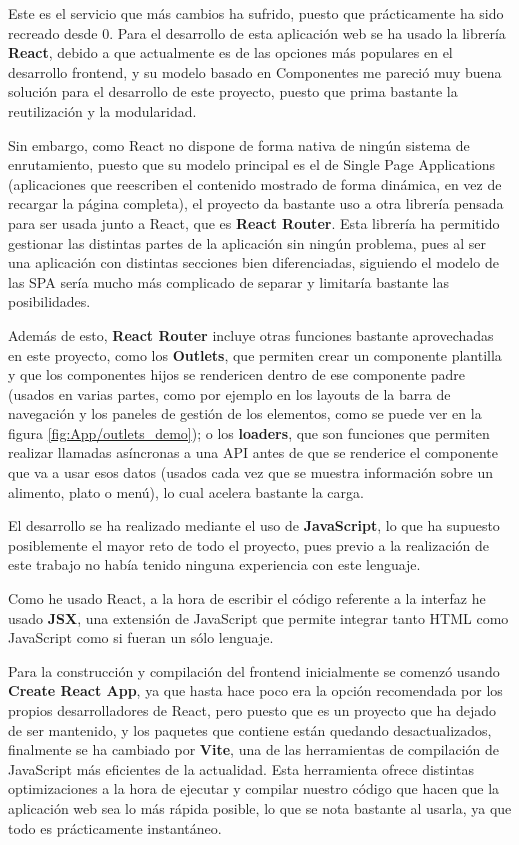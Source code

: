 Este es el servicio que más cambios ha sufrido, puesto que prácticamente ha sido recreado desde 0. Para el desarrollo de esta aplicación web se ha usado la librería \textbf{React}, debido a que actualmente es de las opciones más populares en el desarrollo frontend, y su modelo basado en Componentes me pareció muy buena solución para el desarrollo de este proyecto, puesto que prima bastante la reutilización y la modularidad. 

Sin embargo, como React no dispone de forma nativa de ningún sistema de enrutamiento, puesto que su modelo principal es el de Single Page Applications (aplicaciones que reescriben el contenido mostrado de forma dinámica, en vez de recargar la página completa), el proyecto da bastante uso a otra librería pensada para ser usada junto a React, que es \textbf{React Router}. Esta librería ha permitido gestionar las distintas partes de la aplicación sin ningún problema, pues al ser una aplicación con distintas secciones bien diferenciadas, siguiendo el modelo de las SPA sería mucho más complicado de separar y limitaría bastante las posibilidades.

Además de esto, \textbf{React Router} incluye otras funciones bastante aprovechadas en este proyecto, como los \textbf{Outlets}, que permiten crear un componente plantilla y que los componentes hijos se rendericen dentro de ese componente padre (usados en varias partes, como por ejemplo en los layouts de la barra de navegación y los paneles de gestión de los elementos, como se puede ver en la figura \ref{fig:App/outlets_demo}); o los \textbf{loaders}, que son funciones que permiten realizar llamadas asíncronas a una API antes de que se renderice el componente que va a usar esos datos (usados cada vez que se muestra información sobre un alimento, plato o menú), lo cual acelera bastante la carga.


El desarrollo se ha realizado mediante el uso de \textbf{JavaScript}, lo que ha supuesto posiblemente el mayor reto de todo el proyecto, pues previo a la realización de este trabajo no había tenido ninguna experiencia con este lenguaje.

Como he usado React, a la hora de escribir el código referente a la interfaz he usado \textbf{JSX}, una extensión de JavaScript que permite integrar tanto HTML como JavaScript como si fueran un sólo lenguaje.

Para la construcción y compilación del frontend inicialmente se comenzó usando \textbf{Create React App}, ya que hasta hace poco era la opción recomendada por los propios desarrolladores de React, pero puesto que es un proyecto que ha dejado de ser mantenido, y los paquetes que contiene están quedando desactualizados, finalmente se ha cambiado por \textbf{Vite}, una de las herramientas de compilación de JavaScript más eficientes de la actualidad. Esta herramienta ofrece distintas optimizaciones a la hora de ejecutar y compilar nuestro código que hacen que la aplicación web sea lo más rápida posible, lo que se nota bastante al usarla, ya que todo es prácticamente instantáneo.

